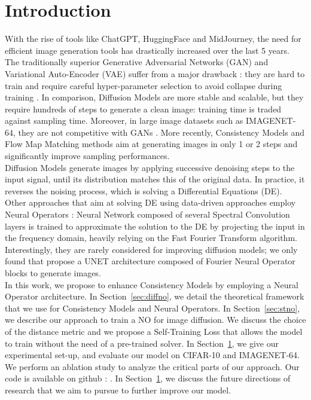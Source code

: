 \section{Introduction}

With the rise of tools like ChatGPT, HuggingFace and MidJourney, the need for efficient image generation tools has drastically increased over the last 5 years. The traditionally superior Generative Adversarial Networks (GAN) \cite{goodfellow2014generativeadversarialnetworks, DBLP:journals/corr/abs-1809-11096, DBLP:journals/corr/abs-1912-00953} and Variational Auto-Encoder (VAE) suffer from a major drawback : they are hard to train and require careful hyper-parameter selection to avoid collapse during training \cite{DBLP:journals/corr/abs-1802-05957}. In comparison, Diffusion Models  \cite{DBLP:journals/corr/abs-2006-11239} are more stable and scalable, but they require hundreds of steps to generate a clean image: training time is traded against sampling time. Moreover, in large image datasets such as IMAGENET-64, they are not competitive with GANs \cite{DBLP:journals/corr/abs-2102-09672}. More recently, Consistency Models \cite{song2023consistencymodels, yang2024consistencyflowmatchingdefining, geng2024consistencymodelseasy} and Flow Map Matching \cite{boffi2025flowmapmatchingstochastic, peng2025flowanchoredconsistencymodels} methods aim at generating images in only 1 or 2 steps and significantly improve sampling performances. \\

Diffusion Models generate images by applying successive denoising steps to the input signal, until its distribution matches this of the original data. In practice, it reverses the noising process, which is solving a Differential Equations (DE). Other approaches that aim at solving DE using data-driven approaches employ Neural Operators \cite{ganeshram2025fcpinohighprecisionphysicsinformed, DBLP:journals/corr/abs-2108-08481} : Neural Network composed of several Spectral Convolution layers is trained to approximate the solution to the DE by projecting the input in the frequency domain, heavily relying on the Fast Fourier Transform algorithm. Interestingly, they are rarely considered for improving diffusion models; we only found \cite{zheng2023fastsamplingdiffusionmodels} that propose a UNET architecture composed of Fourier Neural Operator blocks to generate images. \\

In this work, we propose to enhance Consistency Models by employing a Neural Operator architecture. 
In Section~\ref{sec:diffno}, we detail the theoretical framework that we use for Consistency Models and Neural Operators.  
In Section~\ref{sec:stno}, we describe our approach to train a NO for image diffusion. We discuss the choice of the distance metric and we propose a Self-Training Loss that allows the model to train without the need of a pre-trained solver.
In Section~\ref{}, we give our experimental set-up, and evaluate our model on CIFAR-10 and IMAGENET-64. We perform an ablation study to analyze the critical parts of our approach. Our code is available on github : \repo. 
In Section~\ref{}, we discuss the future directions of research that we aim to pursue to further improve our model.
